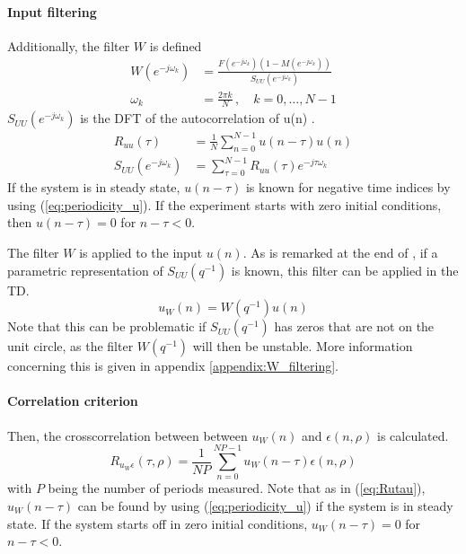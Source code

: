 \paragraph{Input filtering}
Additionally, the filter $W$ is defined \cite[eq. (41)]{Data-driven_model_reference_control}
\begin{align*}
    W(e^{-j\omega_k}) &= \frac{F(e^{-j\omega_k})(1-M(e^{-j\omega_k}))}{S_{UU}(e^{-j \omega_k})} \\
    \omega_k &= \frac{2\pi k}{N} \,,\quad k=0,\ldots,N-1
\end{align*}
$S_{UU}(e^{-j \omega_k})$ is the DFT of the autocorrelation of u(n) \cite[eqs. (38) and (39)]{Data-driven_model_reference_control}.
\begin{align}
    R_{uu}(\tau) &= \frac{1}{N}\sum_{n=0}^{N-1} u(n-\tau) u(n) \label{eq:Rutau}\\
    S_{UU}(e^{-j \omega_k}) &=  \sum_{\tau=0}^{N-1} R_{uu}(\tau) e^{-j \tau \omega_k}\label{eq:Suu}
\end{align}
If the system is in steady state, $u(n-\tau)$ is known for negative time indices by using (\ref{eq:periodicity_u}). If the experiment starts with zero initial conditions, then $u(n-\tau) = 0$ for $n-\tau < 0$.

The filter $W$ is applied to the input $u(n)$. As is remarked at the end of \cite[Sec. 4.4]{Data-driven_model_reference_control}, if a parametric representation of $S_{UU}(q^{-1})$ is known, this filter can be applied in the TD.
\begin{equation*}
    u_W(n) = W(q^{-1}) u(n)
\end{equation*}
Note that this can be problematic if $S_{UU}(q^{-1})$ has zeros that are not on the unit circle, as the filter $W(q^{-1})$ will then be unstable. More information concerning this is given in appendix \ref{appendix:W_filtering}.

\paragraph{Correlation criterion}
Then, the crosscorrelation between between $u_W(n)$ and $\epsilon(n,\rho)$ is calculated.
\begin{equation}
    R_{u_W \epsilon}(\tau,\rho) = \frac{1}{N\!P} \sum_{n=0}^{N\!P-1} u_W(n-\tau) \epsilon(n,\rho)
    \label{eq:RuWepstau}
\end{equation}
with $P$ being the number of periods measured. Note that as in (\ref{eq:Rutau}), $u_W(n-\tau)$ can be found by using (\ref{eq:periodicity_u}) if the system is in steady state. If the system starts off in zero initial conditions, $u_W(n-\tau) = 0$ for $n-\tau < 0$.

